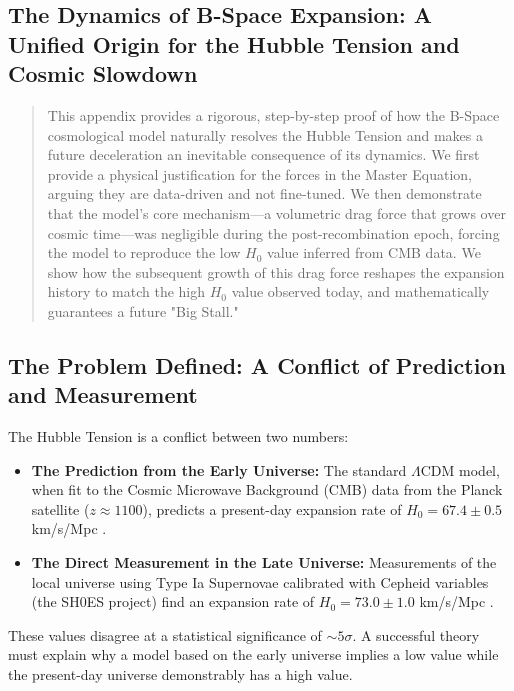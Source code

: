 \documentclass{BSpacePaper} %
\begin{document}
\begin{appendices}
\renewcommand{\thetable}{\Alph{section}\arabic{table}}
\renewcommand{\thefigure}{\Alph{section}\arabic{figure}}
\renewcommand{\theequation}{\Alph{section}.\arabic{equation}}

\section{The Dynamics of B-Space Expansion: A Unified Origin for the Hubble Tension and Cosmic Slowdown}
\label{app:dynamics}
\setcounter{equation}{0}
\setcounter{table}{0}
\setcounter{figure}{0}

\begin{abstract}
\noindent
This appendix provides a rigorous, step-by-step proof of how the B-Space cosmological model naturally resolves the Hubble Tension and makes a future deceleration an inevitable consequence of its dynamics. We first provide a physical justification for the forces in the Master Equation, arguing they are data-driven and not fine-tuned. We then demonstrate that the model's core mechanism—a volumetric drag force that grows over cosmic time—was negligible during the post-recombination epoch, forcing the model to reproduce the low $H_0$ value inferred from CMB data. We show how the subsequent growth of this drag force reshapes the expansion history to match the high $H_0$ value observed today, and mathematically guarantees a future "Big Stall."
\end{abstract}

\subsection{The Problem Defined: A Conflict of Prediction and Measurement}
The Hubble Tension is a conflict between two numbers:
\begin{itemize}
    \item \textbf{The Prediction from the Early Universe:} The standard \(\Lambda\)CDM model, when fit to the Cosmic Microwave Background (CMB) data from the Planck satellite ($z \approx 1100$), predicts a present-day expansion rate of \textbf{$H_0 = 67.4 \pm 0.5$} km/s/Mpc \citep{Planck2020}.
    \item \textbf{The Direct Measurement in the Late Universe:} Measurements of the local universe using Type Ia Supernovae calibrated with Cepheid variables (the SH0ES project) find an expansion rate of \textbf{$H_0 = 73.0 \pm 1.0$} km/s/Mpc \citep{Riess2022}.
\end{itemize}
These values disagree at a statistical significance of $\sim 5\sigma$. A successful theory must explain why a model based on the early universe implies a low value while the present-day universe demonstrably has a high value.


\end{appendices}
\end{document}
